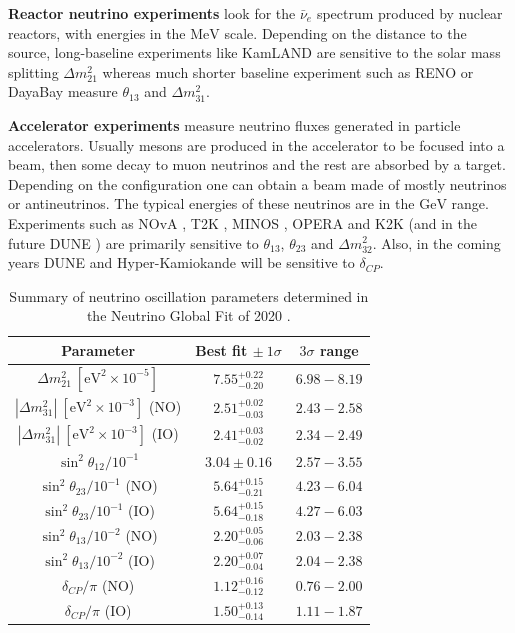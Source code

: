 \textbf{Reactor neutrino experiments} look for the $\bar{\nu}_{e}$ spectrum produced by nuclear reactors, with energies in the $\mathrm{MeV}$ scale. Depending on the distance to the source, long-baseline experiments like KamLAND \cite{KamLAND2013} are sensitive to the solar mass splitting $\Delta m^{2}_{21}$ whereas much shorter baseline experiment such as RENO \cite{RENO2018} or DayaBay \cite{DayaBay2018} measure $\theta_{13}$ and $\Delta m^{2}_{31}$.

\textbf{Accelerator experiments} measure neutrino fluxes generated in particle accelerators. Usually mesons are produced in the accelerator to be focused into a beam, then some decay to muon neutrinos and the rest are absorbed by a target. Depending on the configuration one can obtain a beam made of mostly neutrinos or antineutrinos. The typical energies of these neutrinos are in the $\mathrm{GeV}$ range. Experiments such as NOvA \cite{Nova2020}, T2K \cite{T2K2020}, MINOS \cite{MINOS2014}, OPERA \cite{OPERA2018} and K2K \cite{K2K2006} (and in the future DUNE \cite{DUNE2020}) are primarily sensitive to $\theta_{13}$, $\theta_{23}$ and $\Delta m^{2}_{32}$. Also, in the coming years  DUNE \cite{DUNE2020} and Hyper-Kamiokande \cite{Hyper-Kamiokande2019} will be sensitive to $\delta_{CP}$.

\begin{table}
\centering
\caption[Summary of neutrino oscillation parameters determined in the Neutrino Global Fit of 2020.]{Summary of neutrino oscillation parameters determined in the Neutrino Global Fit of 2020 \cite{deSalas2020}.}
	\begin{tabular}{c|c|c}
		Parameter                                               & Best fit $\pm ~ 1\sigma$ & $3 \sigma$ range   \\[1mm] \hline \rule{0pt}{1.1\normalbaselineskip}
		$\Delta m^{2}_{21}~[\mathrm{eV}^{2} \times 10^{-5}]$                   & $7.55^{+0.22}_{-0.20}$ & $6.98-8.19$\\[3mm]
		$\left|\Delta m^{2}_{31}\right|~[\mathrm{eV}^{2}\times 10^{-3}]$ (NO) & $2.51^{+0.02}_{-0.03}$    & $2.43-2.58$\\[2mm]
		$\left|\Delta m^{2}_{31}\right|~[\mathrm{eV}^{2}\times 10^{-3}]$ (IO) & $2.41^{+0.03}_{-0.02}$ & $2.34-2.49$    \\[3mm]
		$\sin^{2} \theta_{12} / 10^{-1}$ & $3.04 \pm 0.16$ & $2.57-3.55$ \\[3mm]
		$\sin^{2} \theta_{23} / 10^{-1}$ (NO) & $5.64^{+0.15}_{-0.21}$ & $4.23-6.04$ \\[2mm]
		$\sin^{2} \theta_{23} / 10^{-1}$ (IO) & $5.64^{+0.15}_{-0.18}$ & $4.27-6.03$ \\[3mm]
		$\sin^{2} \theta_{13} / 10^{-2}$ (NO) & $2.20^{+0.05}_{-0.06}$ & $2.03-2.38$ \\[2mm]
		$\sin^{2} \theta_{13} / 10^{-2}$ (IO) & $2.20^{+0.07}_{-0.04}$ & $2.04-2.38$ \\[3mm]
		$\delta_{CP} / \pi$ (NO) & $1.12^{+0.16}_{-0.12}$ & $0.76-2.00$ \\[2mm]
		$\delta_{CP} / \pi$ (IO) & $1.50^{+0.13}_{-0.14}$ & $1.11-1.87$
	\end{tabular}
	\label{tab:neutrino_global_fit}
\end{table}


